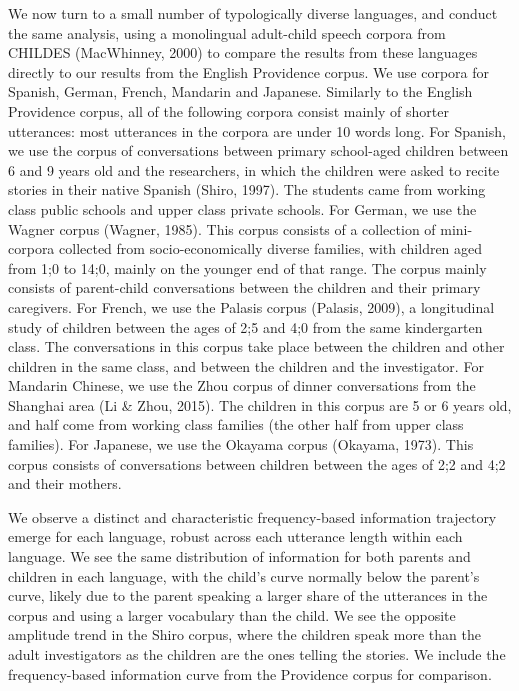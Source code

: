 \documentclass[11pt,]{article}
\begin{document}
We now turn to a small number of typologically diverse languages, and conduct the same analysis, using a monolingual adult-child speech corpora from CHILDES (MacWhinney, 2000) to compare the results from these languages directly to our results from the English Providence corpus. We use corpora for Spanish, German, French, Mandarin and Japanese. Similarly to the English Providence corpus, all of the following corpora consist mainly of shorter utterances: most utterances in the corpora are under 10 words long. For Spanish, we use the corpus of conversations between primary school-aged children between 6 and 9 years old and the researchers, in which the children were asked to recite stories in their native Spanish (Shiro, 1997). The students came from working class public schools and upper class private schools. For German, we use the Wagner corpus (Wagner, 1985). This corpus consists of a collection of mini-corpora collected from socio-economically diverse families, with children aged from 1;0 to 14;0, mainly on the younger end of that range. The corpus mainly consists of parent-child conversations between the children and their primary caregivers. For French, we use the Palasis corpus (Palasis, 2009), a longitudinal study of children between the ages of 2;5 and 4;0 from the same kindergarten class. The conversations in this corpus take place between the children and other children in the same class, and between the children and the investigator. For Mandarin Chinese, we use the Zhou corpus of dinner conversations from the Shanghai area (Li \& Zhou, 2015). The children in this corpus are 5 or 6 years old, and half come from working class families (the other half from upper class families). For Japanese, we use the Okayama corpus (Okayama, 1973). This corpus consists of conversations between children between the ages of 2;2 and 4;2 and their mothers.

We observe a distinct and characteristic frequency-based information trajectory emerge for each language, robust across each utterance length within each language. We see the same distribution of information for both parents and children in each language, with the child's curve normally below the parent's curve, likely due to the parent speaking a larger share of the utterances in the corpus and using a larger vocabulary than the child. We see the opposite amplitude trend in the Shiro corpus, where the children speak more than the adult investigators as the children are the ones telling the stories. We include the frequency-based information curve from the Providence corpus for comparison.
\end{document}
